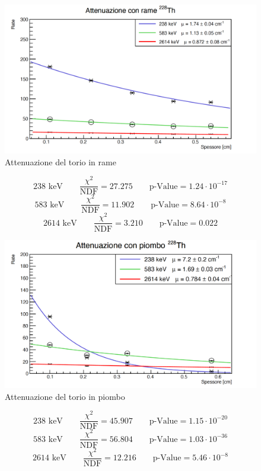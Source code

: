 \documentclass[a4paper,10pt]{article}
\newcommand*{\unit}[1]{\ensuremath{\mathrm{\,#1}}}
\begin{document}
\begin{figure}[H]
    \centering
    \includegraphics[scale=0.45]{grafici/attenuazionetoriorame}
    \caption{Attenuazione del torio in rame}
\end{figure}
$$
	238\, \unit{keV} \qquad \frac{\chi^2}{\textrm{NDF}}  = 27.275 \qquad \textrm{p-Value} = 1.24\cdot 10^{-17}
$$
$$
	583\, \unit{keV} \qquad \frac{\chi^2}{\textrm{NDF}}  = 11.902 \qquad \textrm{p-Value} = 8.64\cdot 10^{-8}
$$
$$
	2614\, \unit{keV} \qquad \frac{\chi^2}{\textrm{NDF}}  = 3.210 \qquad \textrm{p-Value} = 0.022
$$
\begin{figure}[H]
    \centering
    \includegraphics[scale=0.45]{grafici/attenuazionetoriopiombo}
    \caption{Attenuazione del torio in piombo}
\end{figure}
$$
	238\, \unit{keV} \qquad \frac{\chi^2}{\textrm{NDF}}  = 45.907 \qquad \textrm{p-Value} = 1.15\cdot 10^{-20}
$$
$$
	583\, \unit{keV} \qquad \frac{\chi^2}{\textrm{NDF}}  = 56.804 \qquad \textrm{p-Value} = 1.03\cdot 10^{-36}
$$
$$
	2614\, \unit{keV} \qquad \frac{\chi^2}{\textrm{NDF}}  = 12.216 \qquad \textrm{p-Value} = 5.46\cdot 10^{-8}
$$
\end{document}
